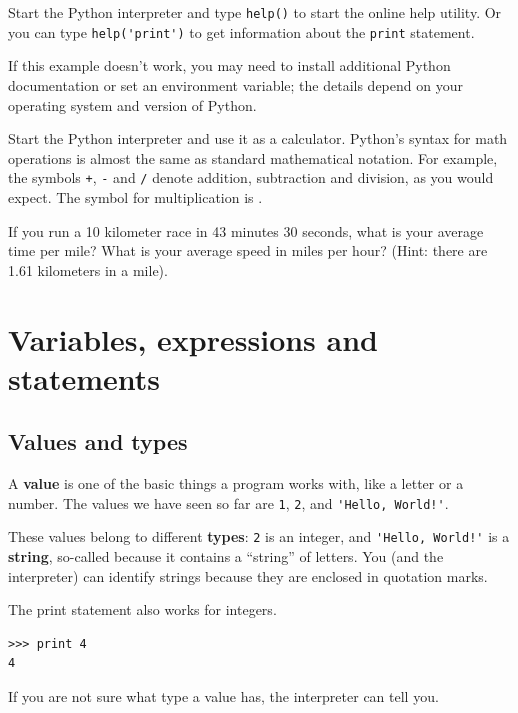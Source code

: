 \documentclass[10pt]{book}
\begin{document}
\begin{ex}
Start the Python interpreter and type {\tt help()} to start the online
help utility.  Or you can type \verb"help('print')" to get information
about the {\tt print} statement.

If this example doesn't work, you
may need to install additional Python documentation or set an
environment variable; the details depend on your operating system and
version of Python.

\end{ex}

\begin{ex}
Start the Python interpreter and use it as a calculator.
Python's syntax for math operations is almost the same as
standard mathematical notation.  For example, the symbols
{\tt +}, {\tt -} and {\tt /} denote addition, subtraction
and division, as you would expect.  The symbol for
multiplication is {\tt *}.

If you run a 10 kilometer race in 43 minutes 30 seconds, what is your
average time per mile?  What is your average speed in miles per hour?
(Hint: there are 1.61 kilometers in a mile).


\end{ex}

\chapter{Variables, expressions and statements}

\section{Values and types}

A {\bf value} is one of the basic things a program works with,
like a letter or a
number.  The values we have seen so far
are {\tt 1}, {\tt 2}, and
\verb"'Hello, World!'".

These values belong to different {\bf types}:
{\tt 2} is an integer, and \verb"'Hello, World!'" is a {\bf string},
so-called because it contains a ``string'' of letters.
You (and the interpreter) can identify
strings because they are enclosed in quotation marks.


The print statement also works for integers.

\beforeverb
\begin{verbatim}
>>> print 4
4
\end{verbatim}
\afterverb
%
If you are not sure what type a value has, the interpreter can tell you.
\end{document}
